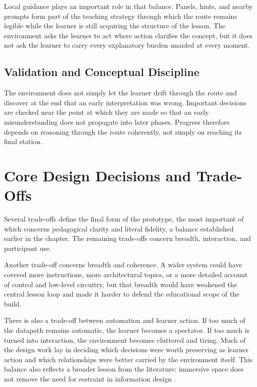 Local guidance plays an important role in that balance. Panels, hints, and nearby prompts form part of the teaching strategy through which the route remains legible while the learner is still acquiring the structure of the lesson. The environment asks the learner to act where action clarifies the concept, but it does not ask the learner to carry every explanatory burden unaided at every moment.

\subsection{Validation and Conceptual Discipline}

The environment does not simply let the learner drift through the route and discover at the end that an early interpretation was wrong. Important decisions are checked near the point at which they are made so that an early misunderstanding does not propagate into later phases. Progress therefore depends on reasoning through the route coherently, not simply on reaching its final station.

\section{Core Design Decisions and Trade-Offs}

Several trade-offs define the final form of the prototype, the most important of which concerns pedagogical clarity and literal fidelity, a balance established earlier in the chapter. The remaining trade-offs concern breadth, interaction, and participant use.

Another trade-off concerns breadth and coherence. A wider system could have covered more instructions, more architectural topics, or a more detailed account of control and low-level circuitry, but that breadth would have weakened the central lesson loop and made it harder to defend the educational scope of the build.

There is also a trade-off between automation and learner action. If too much of the datapath remains automatic, the learner becomes a spectator. If too much is turned into interaction, the environment becomes cluttered and tiring. Much of the design work lay in deciding which decisions were worth preserving as learner action and which relationships were better carried by the environment itself. This balance also reflects a broader lesson from the literature: immersive space does not remove the need for restraint in information design \cite{korkut2023visualization,lee2020data}.

